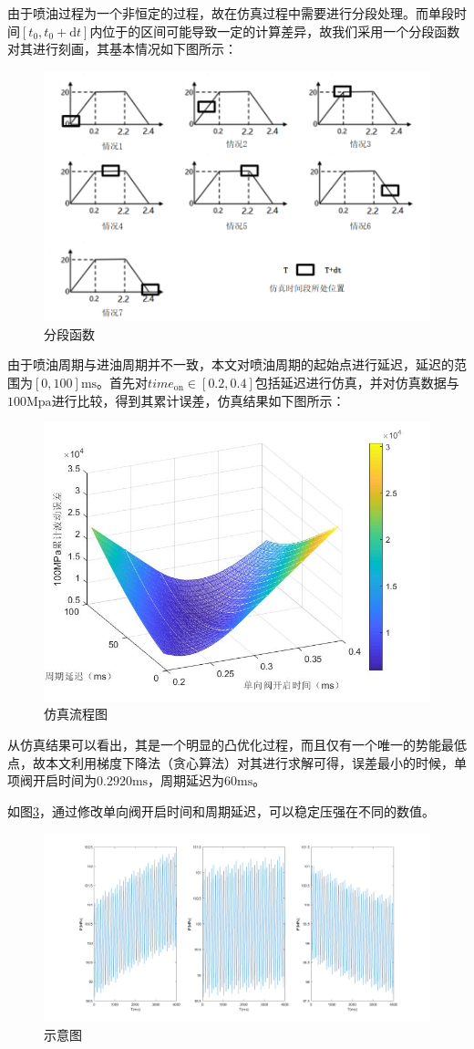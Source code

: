 \documentclass{article}
\begin{document}
由于喷油过程为一个非恒定的过程，故在仿真过程中需要进行分段处理。而单段时间$[t_0,t_0+\text{d}t]$内位于的区间可能导致一定的计算差异，故我们采用一个分段函数对其进行刻画，其基本情况如下图所示：
\begin{figure}[H]
	\centering
	\includegraphics[width=0.7\linewidth]{1-3.png}
	\caption{分段函数}
	\label{fig:}
\end{figure}

由于喷油周期与进油周期并不一致，本文对喷油周期的起始点进行延迟，延迟的范围为$[0,100]\text{ms}$。首先对$time_{\text{on}}\in[0.2,0.4]$包括延迟进行仿真，并对仿真数据与$100\text{Mpa}$进行比较，得到其累计误差，仿真结果如下图所示：
\begin{figure}[H]
	\centering
	\includegraphics[width=0.7\linewidth]{1-4.png}
	\caption{仿真流程图}
	\label{fig:}
\end{figure}

从仿真结果可以看出，其是一个明显的凸优化过程，而且仅有一个唯一的势能最低点，故本文利用梯度下降法（贪心算法）对其进行求解可得，误差最小的时候，单项阀开启时间为$0.2920\text{ms}$，周期延迟为$60\text{ms}$。

如图\ref{fig:示意图}，通过修改单向阀开启时间和周期延迟，可以稳定压强在不同的数值。

\begin{figure}[H]
	\centering
	\includegraphics[width=0.8\linewidth]{1-6.png}
	\caption{示意图}
	\label{fig:示意图}
\end{figure}
\end{document}
